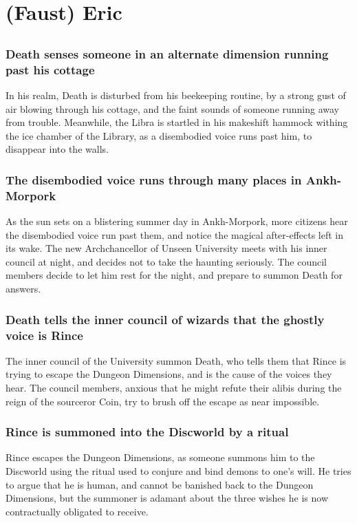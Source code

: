 \section{(Faust) Eric}


\subsection{}
\subsubsection{\Gls{Death} senses someone in an alternate dimension running past his cottage}
In his realm, \Gls{Death} is disturbed from his beekeeping routine, by a strong gust of air blowing
through his cottage, and the faint sounds of someone running away from trouble. Meanwhile, the
\Gls{Libra} is startled in his makeshift hammock withing the ice chamber of the Library, as a
disembodied voice runs past him, to disappear into the walls.

\subsubsection{The disembodied voice runs through many places in Ankh-Morpork}
As the sun sets on a blistering summer day in Ankh-Morpork, more citizens hear the disembodied voice
run past them, and notice the magical after-effects left in its wake. The new Archchancellor of
Unseen University meets with his inner council at night, and decides not to take the haunting
seriously. The council members decide to let him rest for the night, and prepare to summon
\Gls{Death} for answers.

\subsubsection{\Gls{Death} tells the inner council of wizards that the ghostly voice is \Gls{Rince}}
The inner council of the University summon \Gls{Death}, who tells them that \Gls{Rince} is trying
to escape the Dungeon Dimensions, and is the cause of the voices they hear. The council members,
anxious that he might refute their alibis during the reign of the sourceror \Gls{Coin}, try to
brush off the escape as near impossible.

\subsubsection{\Gls{Rince} is summoned into the Discworld by a ritual}
\Gls{Rince} escapes the Dungeon Dimensions, as someone summons him to the Discworld using the ritual
used to conjure and bind demons to one's will. He tries to argue that he is human, and cannot be
banished back to the Dungeon Dimensions, but the summoner is adamant about the three wishes he
is now contractually obligated to receive.

